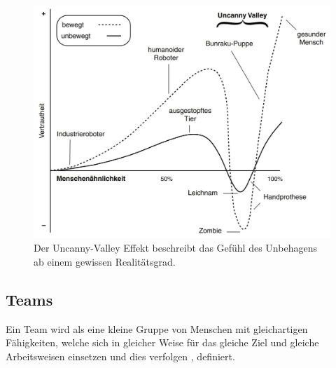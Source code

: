\documentclass[a4paper,11pt]{article}%
\renewcommand{\\}{\vspace*{0.5\baselineskip} \newline}
\begin{document}
\begin{figure}[H]
		\begin{footnotesize}
		\begin{center}
			\includegraphics[scale=.3]{Abbildungen/Uncanny-Valley.JPG}	
			\caption[Der Uncanny-Valley Effekt]{Der Uncanny-Valley Effekt beschreibt das Gefühl des Unbehagens ab einem gewissen Realitätsgrad.}
			\label{Uncanny-Valley}
		\end{center}
		\end{footnotesize}
	\end{figure}	
%
\newpage

	\subsection{Teams}		
	\label{Teamwork}
\label{team}
	Ein Team wird als eine \glqq{}kleine Gruppe von Menschen mit gleichartigen Fähigkeiten, welche sich in gleicher Weise für das gleiche Ziel und gleiche Arbeitsweisen einsetzen und dies verfolgen\dq{} \citep[S. 2]{zenun2007effects}, definiert.
	
\end{document}
